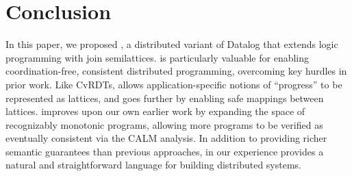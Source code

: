 \section{Conclusion}
In this paper, we proposed \lang, a distributed variant of Datalog that extends
logic programming with join semilattices. \lang is particularly valuable for
enabling coordination-free, consistent distributed programming, overcoming key
hurdles in prior work.  Like CvRDTs, \lang allows application-specific notions of
``progress'' to be represented as lattices, and goes further by enabling safe
mappings between lattices.  \lang improves upon our own earlier work by
expanding the space of recognizably monotonic programs, allowing more programs
to be verified as eventually consistent via the CALM analysis.  In addition to
providing richer semantic guarantees than previous approaches, in our experience
\lang provides a natural and straightforward language for building distributed
systems.

